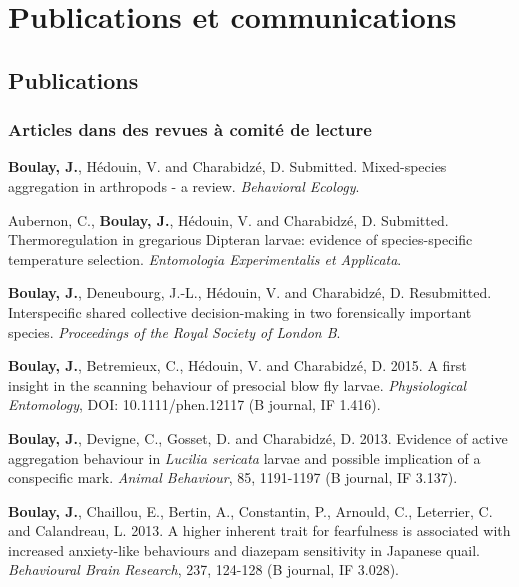 
\chapter{Publications et communications} %

\label{Annexes2} %


\section{Publications}
	\subsection{Articles dans des revues à comité de lecture}
\textbf{Boulay, J.}, Hédouin, V. and Charabidzé, D. Submitted. Mixed-species aggregation in arthropods - a review. \textit{Behavioral Ecology}.

Aubernon, C., \textbf{Boulay, J.}, Hédouin, V. and Charabidzé, D. Submitted. Thermoregulation in gregarious Dipteran larvae: evidence of species-specific temperature selection. \textit{Entomologia Experimentalis et Applicata}.

\textbf{Boulay, J.}, Deneubourg, J.-L., Hédouin, V. and Charabidzé, D. Resubmitted. Interspecific shared collective decision-making in two forensically important species. \textit{Proceedings of the Royal Society of London B}.

\textbf{Boulay, J.}, Betremieux, C., Hédouin, V. and Charabidzé, D. 2015. A first insight in the scanning behaviour of presocial blow fly larvae. \textit{Physiological Entomology}, DOI: 10.1111/phen.12117 (B journal, IF 1.416).

\textbf{Boulay, J.}, Devigne, C., Gosset, D. and Charabidzé, D. 2013. Evidence of active aggregation behaviour in \textit{Lucilia sericata} larvae and possible implication of a conspecific mark. \textit{Animal Behaviour}, 85, 1191-1197 (B journal, IF 3.137).

\textbf{Boulay, J.}, Chaillou, E., Bertin, A., Constantin, P., Arnould, C., Leterrier, C. and Calandreau, L. 2013. A higher inherent trait for fearfulness is associated with increased anxiety-like behaviours and diazepam sensitivity in Japanese quail. \textit{Behavioural Brain Research}, 237, 124-128 (B journal, IF 3.028).


